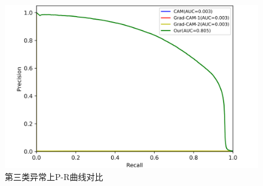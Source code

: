 \begin{figure}[H]
	\centering
	\includegraphics[width=1.0\textwidth]{figure/pr_curve_multi_skin/CIRCLE_pr_curve.png}
	\caption{第三类异常上P-R曲线对比}
	\label{fig:multi_simulate_pr_curve_circle}
\end{figure}


